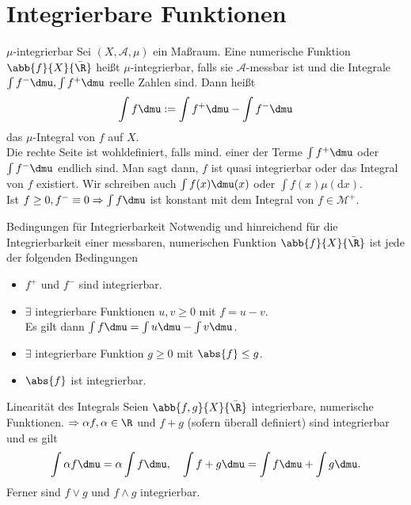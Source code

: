 \section*{Integrierbare Funktionen}

\begin{karte}{\( \mu \)-integrierbar}
	Sei \( (X, \mathcal{A}, \mu) \) ein Maßraum. Eine numerische Funktion 
	\( \abb{f}{X}{\bar{\R}} \) heißt \(\mu\)-integrierbar, falls sie 
	\( \mathcal{A} \)-messbar ist und die Integrale \( \int f^- \dmu, \int f^+ \dmu \) 
	reelle Zahlen sind. Dann heißt 
	\[ \int f \dmu := \int f^+ \dmu - \int f^- \dmu \]
	das \( \mu \)-Integral von \( f \) auf \(X\).\\
	Die rechte Seite ist wohldefiniert, falls mind. einer der Terme \( \int f^+ \dmu \) oder 
	\( \int f^- \dmu \) endlich sind. Man sagt dann, \(f\) ist quasi integrierbar oder 
	das Integral von \(f\) existiert.
	Wir schreiben auch 
	\( \int f(x) \dmu(x) \) oder \( \int f(x) \mu(\mathrm{d}x) \). \\
	Ist \( f \geq 0, f^- \equiv 0 \Rightarrow \int f \dmu\) ist konstant mit dem Integral von 
	\( f\in \mathcal{M}^+ \).
\end{karte}

\begin{karte}{Bedingungen für Integrierbarkeit}
	Notwendig und hinreichend für die Integrierbarkeit einer messbaren, numerischen Funktion 
	\( \abb{f}{X}{\bar{\R}} \) ist jede der folgenden Bedingungen 
	\begin{itemize}
		\item \( f^+ \) und \(f^-\) sind integrierbar.
		\item \(\exists\) integrierbare Funktionen \(u, v \geq 0\) mit \(f = u - v\).\\
		Es gilt dann \( \int f \dmu = \int u \dmu - \int v \dmu \).
		\item \( \exists \) integrierbare Funktion \( g\geq 0 \) mit \( \abs{f} \leq g \).
		\item \( \abs{f} \) ist integrierbar.
	\end{itemize}
\end{karte}

\begin{karte}{Linearität des Integrals}
	Seien \( \abb{f,g}{X}{\bar{\R}} \) integrierbare, numerische 
	Funktionen. \( \Rightarrow \alpha f, \alpha \in \R \) 
	und \( f + g \) (sofern überall definiert) sind integrierbar 
	und es gilt 
	\[ \int \alpha f \dmu = \alpha \int f \dmu, \quad
	\int f+g \dmu = \int f \dmu + \int g \dmu. \]
	Ferner sind \(f \vee g\) und \( f \wedge g \) integrierbar.
\end{karte}

